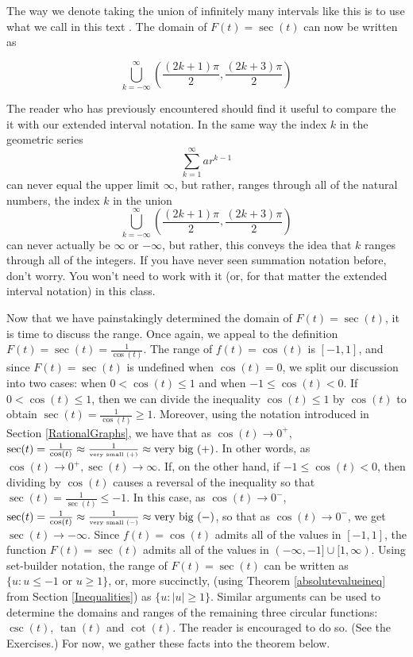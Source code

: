 The way we denote taking the union of infinitely many intervals like this is to use what we call in this text .  The domain of $F(t) = \sec(t)$ can now be written as

\[ \bigcup_{k = -\infty}^{\infty} \left( \frac{(2k+1)\pi}{2}, \frac{(2k+3) \pi}{2} \right) \]

\label{extendedinterval}

The reader who has previously encountered  should find it useful to compare the it with our extended interval notation.  In the same way the index $k$ in the geometric series 
\[\displaystyle{\sum_{k = 1}^{\infty} a r^{k-1}}\] 
can never equal the upper limit $\infty$, but rather, ranges through all of the natural numbers, the index $k$ in the union \[\displaystyle{\bigcup_{k = -\infty}^{\infty} \left( \frac{(2k+1)\pi}{2}, \frac{(2k+3) \pi}{2} \right)}\] can never actually be $\infty$ or $-\infty$, but rather, this conveys the idea that $k$ ranges through all of the integers. If you have never seen summation notation before, don't worry. You won't need to work with it (or, for that matter the extended interval notation) in this class.  

Now that we have painstakingly determined the domain of $F(t) = \sec(t)$, it is time to discuss the range.  Once again, we appeal to the definition $F(t) = \sec(t) = \frac{1}{\cos(t)}$.  The range of $f(t) = \cos(t)$ is $[-1,1]$, and since $F(t) = \sec(t)$ is  undefined when $\cos(t) = 0$, we split our discussion into two cases: when $0 < \cos(t) \leq 1$ and when $-1 \leq \cos(t) < 0$.  If $0 < \cos(t) \leq 1$, then we can divide the inequality $\cos(t) \leq 1$ by  $\cos(t)$ to obtain  $\sec(t) = \frac{1}{\cos(t)} \geq 1$.  Moreover, using the notation introduced in Section \ref{RationalGraphs}, we have that as  $\cos(t) \rightarrow 0^{+}$, $\sec(t)  = \frac{1}{\cos(t)} \approx \frac{1}{\mbox{\tiny very small $(+)$}} \approx \mbox{very big $(+)$}$.  In other words, as $\cos(t) \rightarrow 0^{+}, \sec(t) \rightarrow \infty$. If, on the other hand, if $-1 \leq \cos(t) < 0$, then dividing by $\cos(t)$ causes a reversal of the inequality so that $\sec(t) = \frac{1}{\sec(t)} \leq -1$.  In this case, as $\cos(t) \rightarrow 0^{-}$, $\sec(t)  = \frac{1}{\cos(t)} \approx \frac{1}{\mbox{\tiny very small $(-)$}} \approx \mbox{very big $(-)$}$, so that as $\cos(t) \rightarrow 0^{-}$, we get $\sec(t) \rightarrow -\infty$. Since $f(t) = \cos(t)$ admits all of the values in $[-1,1]$, the function $F(t) = \sec(t)$ admits all of the values in $(-\infty, -1] \cup [1,\infty)$.  Using set-builder notation, the range of $F(t) = \sec(t)$ can be written as $\{ u : \text{$u \leq -1$ or $u \geq 1$} \}$, or, more succinctly, (using Theorem \ref{absolutevalueineq} from Section \ref{Inequalities}) as  $\{ u :|u| \geq 1 \}$.   Similar arguments can be used to determine the domains and ranges of the remaining three circular functions: $\csc(t)$, $\tan(t)$ and $\cot(t)$.  The reader is encouraged to do so.  (See the Exercises.)  For now, we gather these facts into the theorem below.

